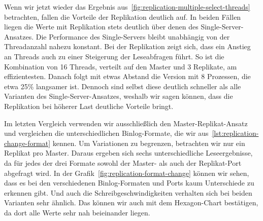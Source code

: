 Wenn wir jetzt wieder das Ergebnis aus~\ref{fig:replication-multiple-select-threads} betrachten, fallen die Vorteile der Replikation deutlich auf.
In beiden Fällen liegen die Werte mit Replikation stets deutlich über denen des Single-Server-Ansatzes.
Die Performance des Single-Servers bleibt unabhängig von der Threadanzahl nahezu konstant.
Bei der Replikation zeigt sich, dass ein Anstieg an Threads auch zu einer Steigerung der Leseabfragen führt.
So ist die Kombination von 16 Threads, verteilt auf den Master und 3 Replikate, am effizientesten.
Danach folgt mit etwas Abstand die Version mit 8 Prozessen, die etwa 25\% langsamer ist.
Dennoch sind selbst diese deutlich schneller als alle Varianten des Single-Server-Ansatzes, weshalb wir sagen können, dass die Replikation bei höherer Last deutliche Vorteile bringt.

Im letzten Vergleich verwenden wir ausschließlich den Master-Replikat-Ansatz und vergleichen die unterschiedlichen Binlog-Formate, die wir aus~\ref{lst:replication-change-format} kennen.
Um Variationen zu begrenzen, betrachten wir nur ein Replikat pro Master.
Daraus ergeben sich sechs unterschiedliche Leseergebnisse, da für jedes der drei Formate sowohl der Master- als auch der Replikat-Port abgefragt wird.
In der Grafik~\ref{fig:replication-format-change} können wir sehen, dass es bei den verschiedenen Binlog-Formaten und Ports kaum Unterschiede zu erkennen gibt.
Und auch die Schreibgeschwindigkeiten verhalten sich bei beiden Varianten sehr ähnlich.
Das können wir auch mit dem Hexagon-Chart bestätigen, da dort alle Werte sehr nah beieinander liegen.

